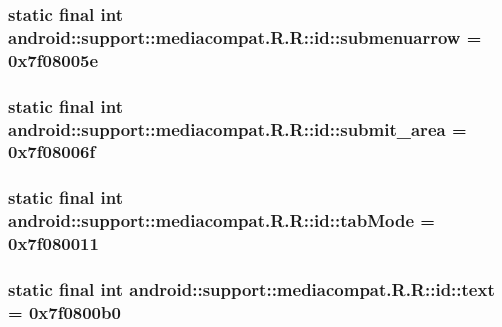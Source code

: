 \hypertarget{classandroid_1_1support_1_1mediacompat_1_1_r_1_1id_14c652b96441ab3cc4ab539b17b69c07}{
\subsubsection[{submenuarrow}]{\setlength{\rightskip}{0pt plus 5cm}static final int android::support::mediacompat.R.R::id::submenuarrow = 0x7f08005e}}
\label{classandroid_1_1support_1_1mediacompat_1_1_r_1_1id_14c652b96441ab3cc4ab539b17b69c07}


\hypertarget{classandroid_1_1support_1_1mediacompat_1_1_r_1_1id_972bf7b7bb5fd72fecb1f5e74ca47ed6}{
\subsubsection[{submit\_\-area}]{\setlength{\rightskip}{0pt plus 5cm}static final int android::support::mediacompat.R.R::id::submit\_\-area = 0x7f08006f}}
\label{classandroid_1_1support_1_1mediacompat_1_1_r_1_1id_972bf7b7bb5fd72fecb1f5e74ca47ed6}


\hypertarget{classandroid_1_1support_1_1mediacompat_1_1_r_1_1id_c637a81985682b929d2b821201615274}{
\subsubsection[{tabMode}]{\setlength{\rightskip}{0pt plus 5cm}static final int android::support::mediacompat.R.R::id::tabMode = 0x7f080011}}
\label{classandroid_1_1support_1_1mediacompat_1_1_r_1_1id_c637a81985682b929d2b821201615274}


\hypertarget{classandroid_1_1support_1_1mediacompat_1_1_r_1_1id_3eb9668f54249287cbbeea002f591d5b}{
\subsubsection[{text}]{\setlength{\rightskip}{0pt plus 5cm}static final int android::support::mediacompat.R.R::id::text = 0x7f0800b0}}
\label{classandroid_1_1support_1_1mediacompat_1_1_r_1_1id_3eb9668f54249287cbbeea002f591d5b}


